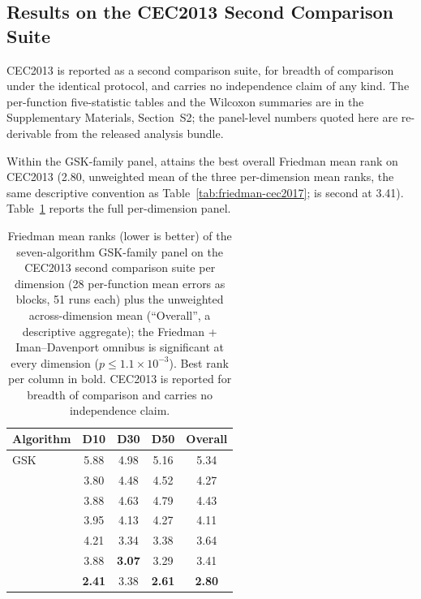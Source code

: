 \subsection{Results on the CEC2013 Second Comparison Suite}\label{sec:exp:cec2013}

CEC2013 is reported as a second comparison suite, for breadth of
comparison under the identical protocol, and carries no
independence claim of any kind. The per-function five-statistic
tables and the Wilcoxon summaries are in the Supplementary Materials,
Section~S2; the panel-level numbers quoted here are re-derivable from
the released analysis bundle.

Within the GSK-family panel, \dtgsk{} attains the best overall
Friedman mean rank on CEC2013 (2.80, unweighted mean of the three
per-dimension mean ranks, the same descriptive convention as
Table~\ref{tab:friedman-cec2017}; \egsk{} is second at 3.41).
Table~\ref{tab:friedman-cec2013} reports the full per-dimension panel.

\begin{table}[H]
\caption{Friedman mean ranks (lower is better) of the seven-algorithm
GSK-family panel on the CEC2013 second comparison suite per dimension
(28 per-function mean errors as blocks, 51 runs each) plus the
unweighted across-dimension mean (``Overall'', a descriptive
aggregate); the Friedman + Iman--Davenport omnibus is significant at
every dimension ($p \leq 1.1 \times 10^{-3}$). Best rank per column in
bold. CEC2013 is reported for breadth of comparison and carries no
independence claim. }\label{tab:friedman-cec2013}
\centering
\tablesize{\footnotesize}
\zebra
\begin{tabular}{lcccc}
\toprule
\textbf{Algorithm} & \textbf{D10} & \textbf{D30} & \textbf{D50} & \textbf{Overall} \\
\midrule
GSK & 5.88 & 4.98 & 5.16 & 5.34 \\
\agsk{} & 3.80 & 4.48 & 4.52 & 4.27 \\
\apgsk{} & 3.88 & 4.63 & 4.79 & 4.43 \\
\fdbagsk{} & 3.95 & 4.13 & 4.27 & 4.11 \\
\atmals{} & 4.21 & 3.34 & 3.38 & 3.64 \\
\egsk{} & 3.88 & \textbf{3.07} & 3.29 & 3.41 \\
\dtgsk{} & \textbf{2.41} & 3.38 & \textbf{2.61} & \textbf{2.80} \\
\bottomrule
\end{tabular}
\end{table}

